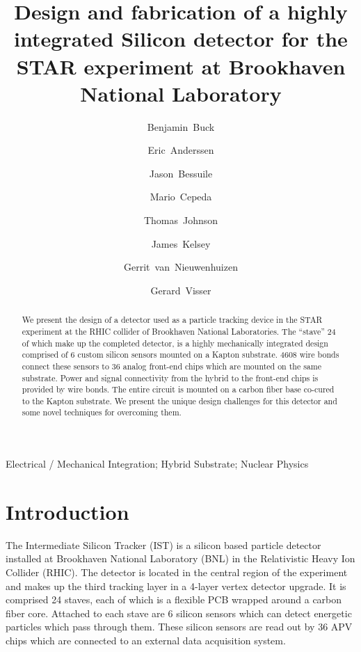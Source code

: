 \documentclass[preprint,12pt]{elsarticle}
\begin{document}
\begin{frontmatter}
\title{Design and fabrication of a highly integrated Silicon detector for the
STAR experiment at Brookhaven National Laboratory}
%
\author[mit]{Benjamin~Buck}
\author[lbl]{Eric~Anderssen}
\author[mit]{Jason~Bessuile}
\author[lbl]{Mario~Cepeda}
\author[lbl]{Thomas~Johnson}
\author[mit]{James~Kelsey}
\author[mit]{Gerrit~van~Nieuwenhuizen}
\author[iu]{Gerard~Visser}
\address[iu]{Indiana University, Bloomington, IN, USA}
\address[lbl]{Lawrence Berkeley National Laboratory, Berkeley, CA, USA}
\address[mit]{Massachusetts Institute of Technology, Cambridge, MA, USA}
%
%
\begin{abstract}
We present the design of a detector used as a particle tracking device in the
STAR experiment at the RHIC collider of Brookhaven National Laboratories. The
``stave'' 24 of which make up the completed detector, is a highly mechanically
integrated design comprised of 6 custom silicon sensors mounted on a Kapton
substrate. 4608 wire bonds connect these sensors to 36 analog front-end chips
which are mounted on the same substrate. Power and signal connectivity from the
hybrid to the front-end chips is provided by wire bonds. The entire circuit is
mounted on a carbon fiber base co-cured to the Kapton substrate. We present the
unique design challenges for this detector and some novel techniques for
overcoming them.
\end{abstract}
\begin{keyword}
Electrical / Mechanical Integration; Hybrid Substrate; Nuclear Physics
\end{keyword}
\end{frontmatter}
%
\section{Introduction}
The Intermediate Silicon Tracker (IST) is a silicon based particle detector
installed at Brookhaven National Laboratory (BNL) in the Relativistic Heavy Ion
Collider (RHIC). The detector is located in the central region of the experiment
and makes up the third tracking layer in a 4-layer vertex detector
upgrade. It is comprised 24 staves, each of which is a flexible PCB wrapped
around a carbon fiber core. Attached to each stave are 6 silicon sensors which
can detect energetic particles which pass through them. These silicon sensors are read
out by 36 APV chips which are connected to an external data acquisition system.
\end{document}
